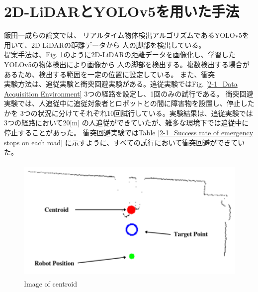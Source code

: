 \section{2D-LiDARとYOLOv5を用いた手法}
飯田一成らの論文\cite{深層学習を用いた人追従機能の開発}では、
リアルタイム物体検出アルゴリズムであるYOLOv5を用いて、2D-LiDARの距離データから
人の脚部を検出している。\\ \indent
提案手法は、Fig. \ref{2-1_Image of centroid}のように2D-LiDARの距離データを画像化し、学習したYOLOv5の物体検出により画像から
人の脚部を検出する。複数検出する場合があるため、検出する範囲を一定の位置に設定している。
また、衝突\\ \indent
実験方法は、追従実験と衝突回避実験がある。追従実験ではFig. \ref{2-1_Data Acquisition Environment} 3つの経路を設定し、1回のみの試行である。
衝突回避実験では、人追従中に追従対象者とロボットとの間に障害物を設置し、停止したかを
3つの状況に分けてそれぞれ10回試行している。実験結果は、追従実験では3つの経路において20[m]
の人追従ができていたが、雑多な環境下では追従中に停止することがあった。
衝突回避実験ではTable \ref{2-1_Success rate of emergency stops on each road}
に示すように、すべての試行において衝突回避ができていた。

\begin{figure}[h]
  \begin{center}
  \includegraphics[height=60mm,clip]{figure/2-1_Image-of-centroid.png}
  \caption{Image of centroid\cite{深層学習を用いた人追従機能の開発}}
  \label{2-1_Image of centroid}
  \end{center}
\end{figure}

